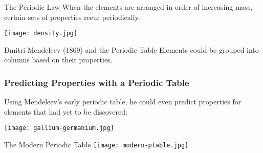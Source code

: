 \documentclass[notes=only]{beamer}
\begin{document}
\begin{frame}{The Periodic Law}
	When the elements are arranged in order of increasing mass,
	certain sets of properties recur periodically.

	\begin{center}
		\texttt{[image: density.jpg]}
	\end{center}
\end{frame}

\begin{frame}[allowframebreaks=1]{Dmitri Mendeleev (1869) and the Periodic Table}
	Elements could be \alert{grouped} into columns based on their properties.

	\begin{center}
	\end{center}
\end{frame}

\begin{frame}
	\frametitle{Predicting Properties with a Periodic Table}

	Using Mendeleev's early periodic table, he could even predict properties
	for elements that had yet to be discovered:

	\bigskip

	\texttt{[image: gallium-germanium.jpg]}
\end{frame}

\begin{frame}{The Modern Periodic Table}
	\texttt{[image: modern-ptable.jpg]}


\end{frame}
\end{document}

